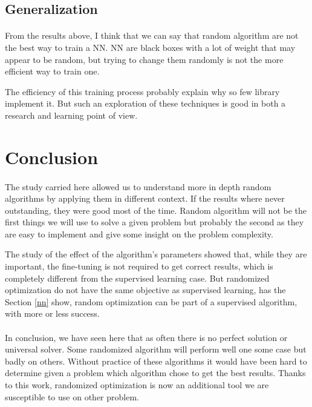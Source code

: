 \documentclass[twocolumn,a4paper,10pt]{article}
\begin{document}
\subsection{Generalization}

\paragraph{}

From the results above, I think that we can say that random algorithm
are not the best way to train a NN. NN are black boxes with a lot
of weight that may appear to be random, but trying to change them
randomly is not the more efficient way to train one.

The efficiency of this training process probably explain why so few
library implement it. But such an exploration of these techniques
is good in both a research and learning point of view.

\section{Conclusion}

\paragraph{}

The study carried here allowed us to understand more in depth random
algorithms by applying them in different context. If the results where
never outstanding, they were good most of the time. Random algorithm
will not be the first things we will use to solve a given problem
but probably the second as they are easy to implement and give some
insight on the problem complexity.

The study of the effect of the algorithm's parameters showed that,
while they are important, the fine-tuning is not required to get correct
results, which is completely different from the supervised learning
case. But randomized optimization do not have the same objective as
supervised learning, has the Section \ref{nn} show, random optimization
can be part of a supervised algorithm, with more or less success.

\paragraph{}

In conclusion, we have seen here that as often there is no perfect
solution or universal solver. Some randomized algorithm will perform
well one some case but badly on others. Without practice of these
algorithms it would have been hard to determine given a problem which
algorithm chose to get the best results. Thanks to this work, randomized
optimization is now an additional tool we are susceptible to use on
other problem.
\end{document}
